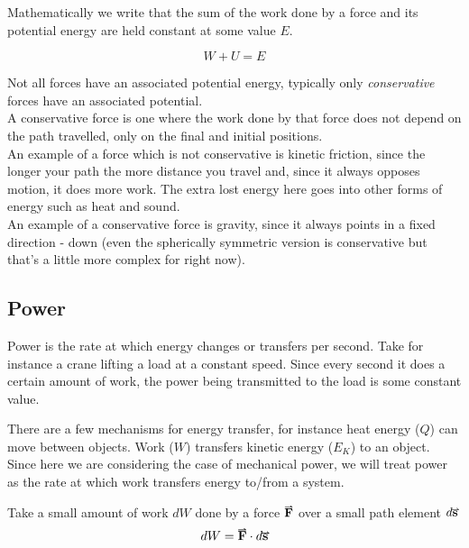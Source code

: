 \documentclass[main.tex]{subfiles}
\begin{document}
                    Mathematically we write that the sum of the work done by a force and its potential energy are held constant at some value $E$.

                    \begin{equation*}
                        W + U = E
                    \end{equation*}
                    
                    Not all forces have an associated potential energy, typically only \textit{conservative} forces have an associated potential.\\
                    A conservative force is one where the work done by that force does not depend on the path travelled, only on the final and initial positions.\\
                    An example of a force which is not conservative is kinetic friction, since the longer your path the more distance you travel and, since it always opposes motion, it does more work. The extra lost energy here goes into other forms of energy such as heat and sound.\\
                    An example of a conservative force is gravity, since it always points in a fixed direction - down (even the spherically symmetric version is conservative but that's a little more complex for right now).

                    

                \subsection{Power}
                    \label{subsec: Power}

                    Power is the rate at which energy changes or transfers per second. Take for instance a crane lifting a load at a constant speed. Since every second it does a certain amount of work, the power being transmitted to the load is some constant value.

                    There are a few mechanisms for energy transfer, for instance heat energy ($Q$) can move between objects.
                    Work ($W$) transfers kinetic energy ($E_K$) to an object.\\
                    Since here we are considering the case of mechanical power, we will treat power as the rate at which work transfers energy to/from a system.

                    Take a small amount of work $dW$ done by a force $\vect{F}$ over a small path element $d\vect{s}$ 
                    \begin{equation}
                        dW = \vect{F}\cdot d\vect{s}
                    \end{equation}
\end{document}
